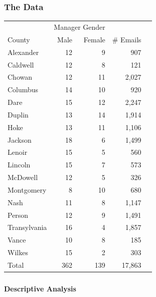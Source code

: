 \documentclass[xcolor={table}]{beamer}
\newenvironment{changemargin}[2]{%
  \begin{list}{}{%
    \setlength{\topsep}{0pt}%
    \setlength{\leftmargin}{#1}%
    \setlength{\rightmargin}{#2}%
    \setlength{\listparindent}{\parindent}%
    \setlength{\itemindent}{\parindent}%
    \setlength{\parsep}{\parskip}%
  }%
  \item[]}{\end{list}}
\begin{document}
\begin{frame}\frametitle{The Data}
	\small
\begin{changemargin}{-1cm}{ -1cm}	
	  \centering
	  \vspace*{-.3in}
	  \begin{tabular}{lrrrr}
	    \toprule
	    & \multicolumn{2}{c}{Manager Gender} & \\
	    \cmidrule{2-3}
	    County & Male & Female & \# Emails  \\
	    \midrule
	    Alexander & 12 & 9 & 907   \\
	    Caldwell & 12 & 8 & 121     \\
	    Chowan & 12 & 11 & 2,027   \\
	    Columbus & 14 & 10 & 920   \\
	    Dare & 15 & 12 & 2,247    \\
	    Duplin & 13 & 14 & 1,914    \\
	    Hoke & 13 & 11 & 1,106  \\
	    Jackson & 18 & 6 & 1,499    \\
	    Lenoir & 15 & 5 & 560  \\
	    Lincoln & 15 & 7 & 573   \\
	    McDowell & 12 & 5 & 326   \\
	    Montgomery & 8 & 10 & 680   \\
	    Nash & 11 & 8 & 1,147  \\
	    Person & 12 & 9 & 1,491   \\
	    Transylvania & 16 & 4 & 1,857  \\
	    Vance & 10 & 8 & 185   \\
	    Wilkes & 15 & 2 & 303   \\
	    \midrule
	    Total & 362 & 139 & 17,863 \\
	    \bottomrule
	  \end{tabular}

\end{changemargin}

\end{frame}

\begin{frame}\frametitle{}
	\begin{center}
		\Huge\textbf{Descriptive Analysis}
	\end{center}
\end{frame}
\end{document}
